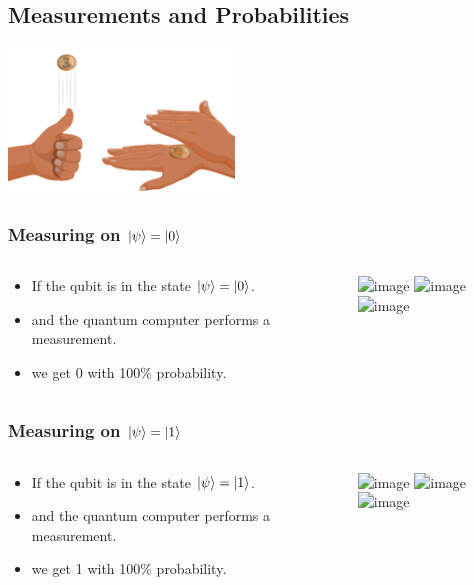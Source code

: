 \documentclass[10pt]{beamer}
\begin{document}
\begin{frame}
  \section{Measurements and Probabilities}

  \centering
  \includegraphics[width=6cm]{img/coin-flip.png}
\end{frame}
\begin{frame}
  \frametitle{Measuring on $\ket{\psi}=\ket{0}$}
  \begin{columns}
    \begin{column}{0.4\linewidth}
      \begin{itemize}
      \item<1-|alert@1> If the qubit is in the state $\ket{\psi}=\ket{0}$.
      \item<2-|alert@2> and the quantum computer performs a measurement.
      \item<3-|alert@3> we get 0 with 100\% probability.
      \end{itemize}
    \end{column}
    \begin{column}{0.5\linewidth}
      \includegraphics<1>[width=\linewidth]{img/euro-0.jpg}
      \includegraphics<2>[width=\linewidth]{img/coin-measure.png}
      \includegraphics<3>[width=\linewidth]{img/euro-0.jpg}
    \end{column}
  \end{columns}
\end{frame}

\begin{frame}
  \frametitle{Measuring on $\ket{\psi}=\ket{1}$}
  \begin{columns}
    \begin{column}{0.4\linewidth}
      \begin{itemize}
      \item<1-|alert@1> If the qubit is in the state $\ket{\psi}=\ket{1}$.
      \item<2-|alert@2> and the quantum computer performs a measurement.
      \item<3-|alert@3> we get 1 with 100\% probability.
      \end{itemize}
    \end{column}
    \begin{column}{0.5\linewidth}
      \includegraphics<1>[width=\linewidth]{img/euro-1.jpg}
      \includegraphics<2>[width=\linewidth]{img/coin-measure.png}
      \includegraphics<3>[width=\linewidth]{img/euro-1.jpg}
    \end{column}
  \end{columns}
\end{frame}
\end{document}
